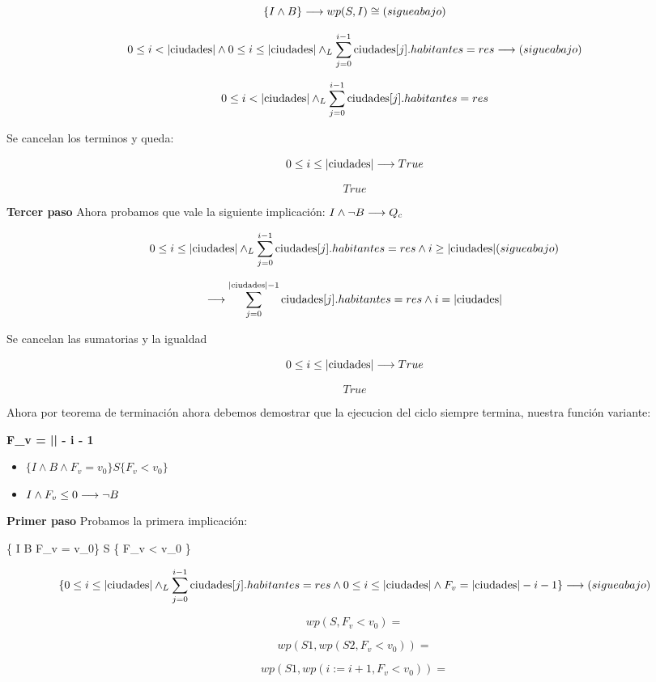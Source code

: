 \documentclass[10pt,a4paper]{article}
\begin{document}
\[
\{I \land B\} \longrightarrow wp(S, I) \cong (sigue abajo)
\]

\[
 0 \leq i < |\text{ciudades}| \land 0 \leq i \leq |\text{ciudades}| \land _L \sum_{j=0}^{i-1} \text{ciudades}[j].habitantes = res \longrightarrow (sigue abajo)
\]

\[
0 \leq i < |\text{ciudades}| \land _L \sum_{j=0}^{i-1} \text{ciudades}[j].habitantes = res
\]

Se cancelan los terminos y queda:

\[
0 \leq i \leq |\text{ciudades}| \longrightarrow True
\]

\[
True
\]

\textbf{Tercer paso} Ahora probamos que vale la siguiente implicación:
\( I \land \neg B \longrightarrow Q_c \)

\[
0 \leq i \leq |\text{ciudades}| \land _L \sum_{j=0}^{i-1} \text{ciudades}[j].habitantes = res \land i \geq |\text{ciudades}| (sigue abajo)
\]

\[
\longrightarrow \sum_{j=0}^{|\text{ciudades}|-1} \text{ciudades}[j].habitantes = res \land i = |\text{ciudades}|
\]

Se cancelan las sumatorias y la igualdad

\[
0 \leq i \leq |\text{ciudades}| \longrightarrow True
\]

\[
True
\]

Ahora por teorema de terminación ahora debemos demostrar que la ejecucion del ciclo siempre termina, nuestra función variante:

\textbf{F_v = || - i - 1}

\begin{itemize}
    \item \( \{ I \land B \land F_v = v_0\} S \{ F_v < v_0 \} \)
    \item \( I \land F_v \leq 0 \longrightarrow \neg B \)
\end{itemize}

\textbf{Primer paso} Probamos la primera implicación:

\{ I \land B \land F_v = v_0\} S \{ F_v < v_0 \}

\[
\{0 \leq i \leq |\text{ciudades}| \land _L \sum_{j=0}^{i-1} \text{ciudades}[j].habitantes = res \land 0 \leq i \leq |\text{ciudades}| \land F_v = |\text{ciudades}| - i - 1\} \longrightarrow (sigue abajo)
\]

\[
wp(S, F_v < v_0) =
\]

\[
wp(S1, wp(S2, F_v < v_0)) =
\]

\[
wp(S1, wp(i:=i+1, F_v < v_0)) =
\]
\end{document}
